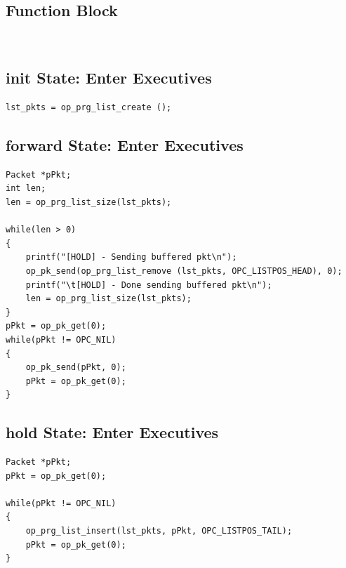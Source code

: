 \subsection{Function Block}
{\tiny
\begin{verbatim}


\end{verbatim}
}
\subsection{init State: Enter Executives}
{\tiny
\begin{verbatim}
lst_pkts = op_prg_list_create (); 
\end{verbatim}
}

\subsection{forward State: Enter Executives}
{\tiny
\begin{verbatim}
Packet *pPkt;
int len;
len = op_prg_list_size(lst_pkts);

while(len > 0)
{
	printf("[HOLD] - Sending buffered pkt\n");
	op_pk_send(op_prg_list_remove (lst_pkts, OPC_LISTPOS_HEAD), 0);
	printf("\t[HOLD] - Done sending buffered pkt\n");
	len = op_prg_list_size(lst_pkts);	
}
pPkt = op_pk_get(0);
while(pPkt != OPC_NIL)
{
	op_pk_send(pPkt, 0);
	pPkt = op_pk_get(0);
}

\end{verbatim}
}

\subsection{hold State: Enter Executives}
{\tiny
\begin{verbatim}
Packet *pPkt;
pPkt = op_pk_get(0);

while(pPkt != OPC_NIL)
{
	op_prg_list_insert(lst_pkts, pPkt, OPC_LISTPOS_TAIL);
	pPkt = op_pk_get(0);
}

\end{verbatim}
}